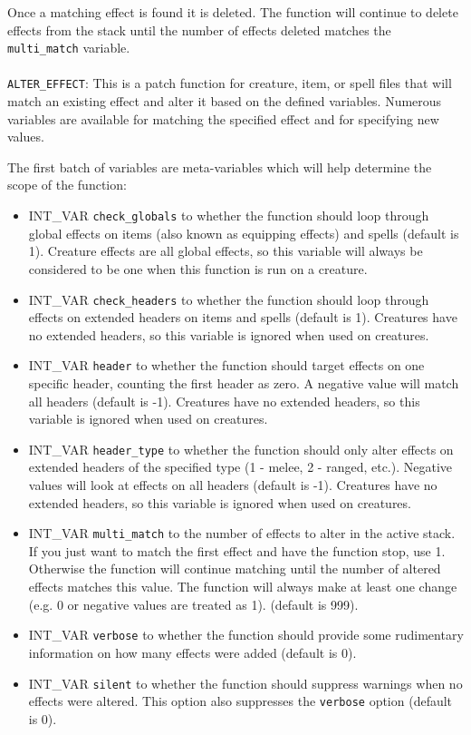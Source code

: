 \documentclass{article}
\def\t#1{{\tt #1}}
\begin{document}
Once a matching effect is found it is deleted. The function will continue to delete effects from the stack until the number of effects deleted matches the \verb+multi_match+ variable.\\
\\

\verb+ALTER_EFFECT+: This is a patch function for creature, item, or spell files that will match an existing effect and alter it based on the defined variables. Numerous variables are available for matching the specified effect and for specifying new values.

The first batch of variables are meta-variables which will help determine the scope of the function:

\begin{itemize}
\item INT_VAR \verb+check_globals+ to whether the function should loop through global effects on items (also known as equipping effects) and spells (default is 1). Creature effects are all global effects, so this variable will always be considered to be one when this function is run on a creature.
\item INT_VAR \verb+check_headers+ to whether the function should loop through effects on extended headers on items and spells (default is 1). Creatures have no extended headers, so this variable is ignored when used on creatures.
\item INT_VAR \verb+header+ to whether the function should target effects on one specific header, counting the first header as zero. A negative value will match all headers (default is -1). Creatures have no extended headers, so this variable is ignored when used on creatures.
\item INT_VAR \verb+header_type+ to whether the function should only alter effects on extended headers of the specified type (1 - melee, 2 - ranged, etc.). Negative values will look at effects on all headers (default is -1). Creatures have no extended headers, so this variable is ignored when used on creatures.
\item INT_VAR \verb+multi_match+ to the number of effects to alter in the active stack. If you just want to match the first effect and have the function stop, use 1. Otherwise the function will continue matching until the number of altered effects matches this value. The function will always make at least one change (e.g. 0 or negative values are treated as 1). (default is 999).
\item INT_VAR \verb+verbose+ to whether the function should provide some rudimentary information on how many effects were added (default is 0).
\item INT_VAR \verb+silent+ to whether the function should suppress warnings when no effects were altered. This option also suppresses the \t{verbose} option (default is 0).
\end{itemize}
\end{document}
